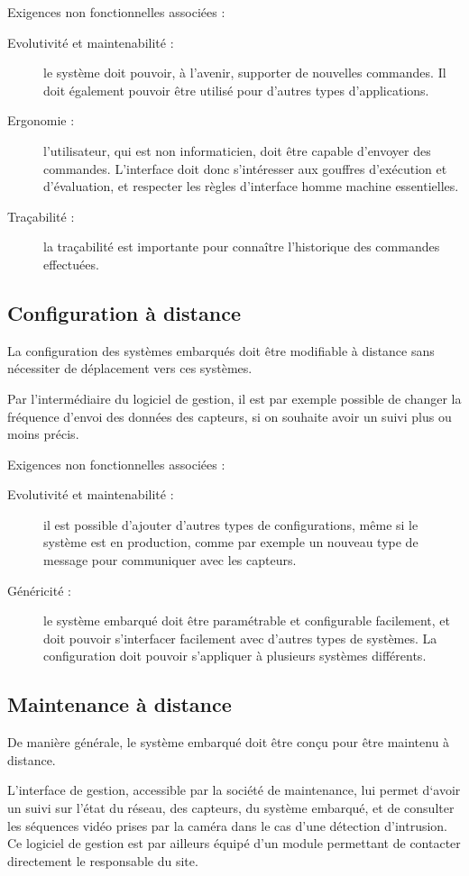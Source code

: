 \documentclass{mise_en_page}
\begin{document}
Exigences non fonctionnelles associées : 

\begin{description}
\item[Evolutivité et maintenabilité :] le système doit pouvoir, à
l’avenir, supporter de nouvelles commandes. Il doit également pouvoir
être utilisé pour d’autres types d’applications. 
\item[Ergonomie :] l’utilisateur, qui est non informaticien, doit être
capable d’envoyer des commandes. L’interface doit donc s’intéresser aux
gouffres d’exécution et d’évaluation, et respecter les règles
d’interface homme machine essentielles. 
\item[Traçabilité :] la traçabilité est importante pour connaître
l’historique des commandes effectuées.
\end{description}
\subsection{Configuration à distance}
La configuration des systèmes embarqués doit être modifiable à distance
sans nécessiter de déplacement vers ces systèmes.

Par l’intermédiaire du logiciel de gestion, il est par exemple possible
de changer la fréquence d’envoi des données des capteurs, si on
souhaite avoir un suivi plus ou moins précis. 

Exigences non fonctionnelles associées : 

\begin{description}
\item[Evolutivité et maintenabilité :] il est possible d’ajouter d’autres
types de configurations, même si le système est en production, comme
par exemple un nouveau type de message pour communiquer avec les
capteurs.
\item[Généricité :] le système embarqué doit être paramétrable et
configurable facilement, et doit pouvoir s’interfacer facilement  avec
d’autres types de systèmes. La configuration doit pouvoir s’appliquer à
plusieurs systèmes différents.
\end{description}
\subsection{Maintenance à distance}
De manière générale, le système embarqué doit être conçu pour être
maintenu à distance.

L’interface de gestion, accessible par la société de maintenance, lui
permet d‘avoir un suivi sur l’état du réseau, des capteurs, du système
embarqué, et de consulter les séquences vidéo prises par la caméra dans
le cas d’une détection d’intrusion. Ce logiciel de gestion est par
ailleurs équipé d’un module permettant de contacter directement le
responsable du site.
\end{document}
